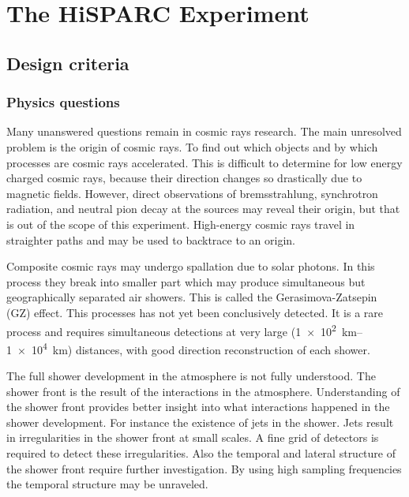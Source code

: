 \chapter{The HiSPARC Experiment}

\section{Design criteria}

\subsection{Physics questions}

Many unanswered questions remain in cosmic rays research. The main unresolved problem is the origin of cosmic rays. To find out which objects and by which processes are cosmic rays accelerated. This is difficult to determine for low energy charged cosmic rays, because their direction changes so drastically due to magnetic fields. However, direct observations of bremsstrahlung, synchrotron radiation, and neutral pion decay at the sources may reveal their origin, but that is out of the scope of this experiment. High-energy cosmic rays travel in straighter paths and may be used to backtrace to an origin.

Composite cosmic rays may undergo spallation due to solar photons. In this process they break into smaller part which may produce simultaneous but geographically separated air showers. This is called the Gerasimova-Zatsepin (GZ) effect. This processes has not yet been conclusively detected. It is a rare process and requires simultaneous detections at very large (\SIrange{1e2}{1e4}{\kilo\meter}) distances, with good direction reconstruction of each shower.

The full shower development in the atmosphere is not fully understood. The shower front is the result of the interactions in the atmosphere. Understanding of the shower front provides better insight into what interactions happened in the shower development. For instance the existence of jets in the shower. Jets result in irregularities in the shower front at small scales. A fine grid of detectors is required to detect these irregularities. Also the temporal and lateral structure of the shower front require further investigation. By using high sampling frequencies the temporal structure may be unraveled.

